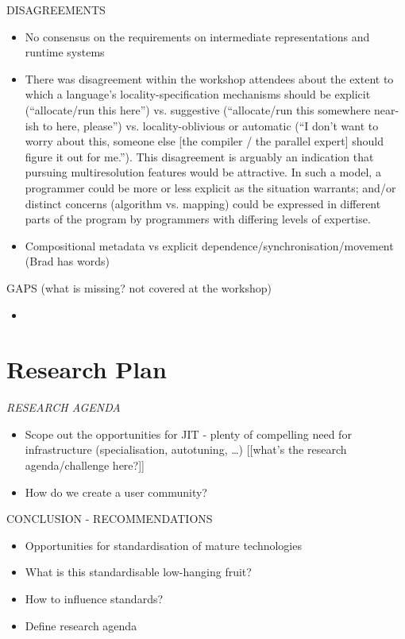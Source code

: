 {DISAGREEMENTS
  \begin{itemize}
   \item No consensus on the requirements on intermediate representations and runtime systems

   \item There was disagreement within the workshop attendees about
     the extent to which a language's locality-specification
     mechanisms should be explicit (``allocate/run this here'')
     vs. suggestive (``allocate/run this somewhere near-ish to here,
     please'') vs. locality-oblivious or automatic (``I don't want to
     worry about this, someone else [the compiler / the parallel
       expert] should figure it out for me.'').  This disagreement is
     arguably an indication that pursuing multiresolution features
     would be attractive.  In such a model, a programmer could be more
     or less explicit as the situation warrants; and/or distinct
     concerns (algorithm vs. mapping) could be expressed in different
     parts of the program by programmers with differing levels of
     expertise.

   \item Compositional metadata vs explicit dependence/synchronisation/movement (Brad has words)
  \end{itemize}


  GAPS (what is missing? not covered at the workshop)
  \begin{itemize}
   \item
   \end{itemize}

}
\section{Research Plan}

{\it
RESEARCH AGENDA
  \begin{itemize}
  \item Scope out the opportunities for JIT - plenty of compelling need for infrastructure (specialisation, autotuning, …) [[what’s the research agenda/challenge here?]]
  \item How do we create a user community?
  \end{itemize}

CONCLUSION - RECOMMENDATIONS
  \begin{itemize}
  \item Opportunities for standardisation of mature technologies
  \item What is this standardisable low-hanging fruit?
  \item How to influence standards?
  \item Define research agenda
  \end{itemize}
}


